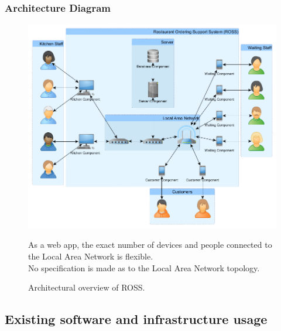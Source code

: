 \documentclass[11pt, a4paper]{report}
\begin{document}
\subsubsection{Architecture Diagram}

\begin{figure}[H]
\centering
\includegraphics[scale=0.5]{Figures/SystemArchitectureDiagram.png}
\caption{Architectural overview of ROSS.}
\vspace{1cm}
\flushleft
As a web app, the exact number of devices and people connected to the Local Area Network is flexible.\\
No specification is made as to the Local Area Network topology.
\end{figure}

\pagebreak

\subsection{Existing software and infrastructure usage}
\end{document}
